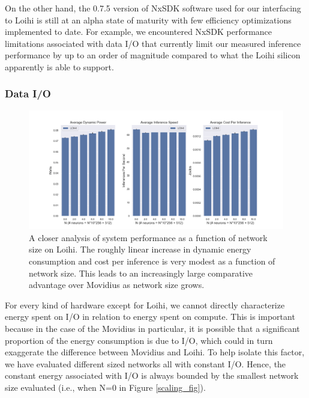 \documentclass{article}
\begin{document}
On the other hand, the 0.7.5 version of NxSDK software used for our interfacing to Loihi is still at an alpha state of maturity with few efficiency optimizations implemented to date. For example, we encountered NxSDK performance limitations associated with data I/O that currently limit our measured inference performance by up to an order of magnitude compared to what the Loihi silicon apparently is able to support.

\subsubsection{Data I/O}


\begin{figure}[ht!]
\centering
    \includegraphics[width=6.7in]{./figures/loihi_summary.png}
    \caption{A closer analysis of system performance as a function of network size on Loihi. The roughly linear increase in dynamic energy consumption and cost per inference is very modest as a function of network size. This leads to an increasingly large comparative advantage over Movidius as network size grows.}
\label{loihi_fig}
\end{figure}

For every kind of hardware except for Loihi, we cannot directly characterize energy spent on I/O in relation to energy spent on compute. This is important because in the case of the Movidius in particular, it is possible that a significant proportion of the energy consumption is due to I/O, which could in turn exaggerate the difference between Movidius and Loihi. To help isolate this factor, we have evaluated different sized networks all with constant I/O. Hence, the constant energy associated with I/O is always bounded by the smallest network size evaluated (i.e., when N=0 in Figure \ref{scaling_fig}).
\end{document}
